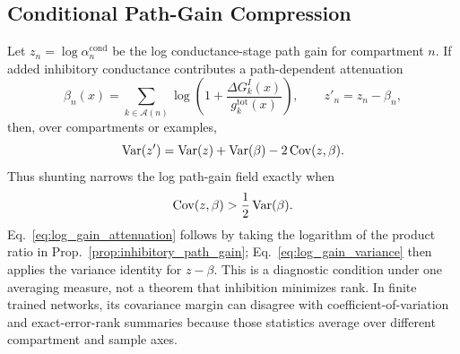     \subsection{Conditional Path-Gain Compression}
    Let $z_n=\log \alpha_n^{\mathrm{cond}}$ be the log conductance-stage path gain for compartment $n$. If added inhibitory conductance contributes a path-dependent attenuation
    \begin{equation}
    \beta_n(x)=\sum_{k\in\mathcal{A}(n)}
    \log\!\left(1+\frac{\Delta G_k^I(x)}{g_k^{\mathrm{tot}}(x)}\right),
    \qquad
    z'_n=z_n-\beta_n,
    \label{eq:log_gain_attenuation}
    \end{equation}
    then, over compartments or examples,
    \begin{equation}
    \operatorname{Var}(z')=\operatorname{Var}(z)+\operatorname{Var}(\beta)-2\operatorname{Cov}(z,\beta).
    \label{eq:log_gain_variance}
    \end{equation}
    Thus shunting narrows the log path-gain field exactly when
    \begin{equation}
    \operatorname{Cov}(z,\beta)>\frac{1}{2}\operatorname{Var}(\beta).
    \label{eq:compression_condition}
    \end{equation}
    Eq.~\eqref{eq:log_gain_attenuation} follows by taking the logarithm of the product ratio in Prop.~\ref{prop:inhibitory_path_gain}; Eq.~\eqref{eq:log_gain_variance} then applies the variance identity for $z-\beta$. This is a diagnostic condition under one averaging measure, not a theorem that inhibition minimizes rank. In finite trained networks, its covariance margin can disagree with coefficient-of-variation and exact-error-rank summaries because those statistics average over different compartment and sample axes.


